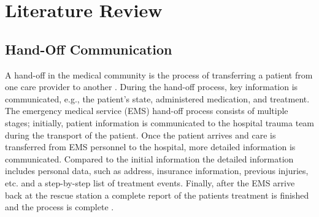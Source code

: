 
\chapter{Literature Review}
\label{ch:Literature-Review}

\section{Hand-Off Communication}
\label{sec:Literature-Review:Hand-Off Communication}
A hand-off in the medical community is the process of transferring a patient from one care provider to another \cite{SoletDJNorvellJMRutanGH2005}. During the hand-off process, key information is communicated, e.g., the patient’s state, administered medication, and treatment. The emergency medical service (\gls{EMS}) hand-off process consists of multiple stages; initially, patient information is communicated to the hospital trauma team during the transport of the patient. Once the patient arrives and care is transferred from EMS personnel to the hospital, more detailed information is communicated. Compared to the initial information the detailed information includes personal data, such as address, insurance information, previous injuries, etc. and a step-by-step list of treatment events. Finally, after the EMS arrive back at the rescue station a complete report of the patients treatment is finished and the process is complete \cite{Cohen2010}.
